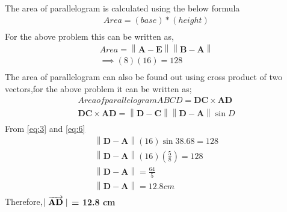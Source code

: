 \documentclass{article}
\providecommand{\norm}[1]{\left\lVert#1\right\rVert}
\let\vec\mathbf
\begin{document}
The area of parallelogram is calculated using the below formula\\
\begin{align}
	Area = (base)*(height)\\
\end{align}
For the above problem this can be written as,
\begin{align}
	Area = \norm{\vec{A} - \vec{E}} \norm{\vec{B} - \vec{A}}\\
	\implies (8) (16) = 128
	\label{eq:5}\\
\end{align}
The area of parallelogram can also be found out using cross product of two vectors,for the above problem it can be written as;
\begin{align}
	Area of parallelogram ABCD = \vec{DC} \times \vec{AD}\\
	\vec{DC} \times \vec{AD} = \norm{\vec{D} - \vec{C}} \norm{\vec{D} - \vec{A}} \sin{D}
	\label{eq:6}\\
\end{align}
From \ref{eq:3} and \ref{eq:6}\\
\begin{align}
	\norm{\vec{D} - \vec{A}} (16) \sin{38.68} = 128\\
	\norm{\vec{D} - \vec{A}} (16) (\frac{5}{8}) = 128\\
	\norm{\vec{D} - \vec{A}} = \frac{64}{5}\\
	\norm{\vec{D} - \vec{A}} = 12.8cm\\
\end{align}
Therefore,$|\hspace{0.1cm}$\textbf{$\overrightarrow{\vec{AD}}\hspace{0.1cm} |$ = 12.8 cm}\\
\end{document}

